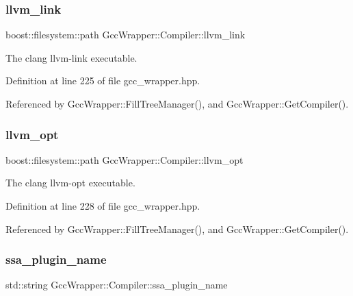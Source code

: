 \subsubsection{\texorpdfstring{llvm\+\_\+link}{llvm\_link}}
{\footnotesize\ttfamily boost\+::filesystem\+::path Gcc\+Wrapper\+::\+Compiler\+::llvm\+\_\+link}



The clang llvm-\/link executable. 



Definition at line 225 of file gcc\+\_\+wrapper.\+hpp.



Referenced by Gcc\+Wrapper\+::\+Fill\+Tree\+Manager(), and Gcc\+Wrapper\+::\+Get\+Compiler().

\mbox{\label{classGccWrapper_1_1Compiler_a9205e2ca841c6216d3e2e6f426fc6055}} 
\subsubsection{\texorpdfstring{llvm\+\_\+opt}{llvm\_opt}}
{\footnotesize\ttfamily boost\+::filesystem\+::path Gcc\+Wrapper\+::\+Compiler\+::llvm\+\_\+opt}



The clang llvm-\/opt executable. 



Definition at line 228 of file gcc\+\_\+wrapper.\+hpp.



Referenced by Gcc\+Wrapper\+::\+Fill\+Tree\+Manager(), and Gcc\+Wrapper\+::\+Get\+Compiler().

\mbox{\label{classGccWrapper_1_1Compiler_ae4c7ba84eedc7909f98fa41388d6321b}} 
\subsubsection{\texorpdfstring{ssa\+\_\+plugin\+\_\+name}{ssa\_plugin\_name}}
{\footnotesize\ttfamily std\+::string Gcc\+Wrapper\+::\+Compiler\+::ssa\+\_\+plugin\+\_\+name}



